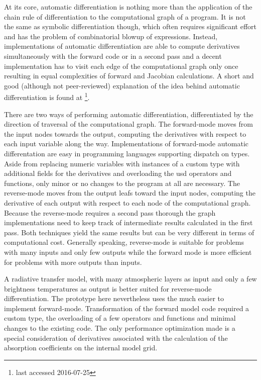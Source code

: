     At its core, automatic differentiation is nothing more than the application
    of the chain rule of differentiation to the computational graph of
    a program. It is not the same as symbolic differentiation though, which
    often requires significant effort and has the problem of combinatorial
    blowup of expressions. Instead, implementations of automatic
    differentiation are able to compute derivatives simultaneously with the
    forward code or in a second pass and a decent implementation has to visit
    each edge of the computational graph only once resulting in equal
    complexities of forward and Jacobian calculations. A short and good
    (although not peer-reviewed) explanation of the idea behind automatic
    differentiation is found at
    \footnote{last accessed 2016-07-25}.

    There are two ways of performing automatic differentiation, differentiated
    by the direction of traversal of the computational graph. The forward-mode
    moves from the input nodes towards the output, computing the derivatives
    with respect to each input variable along the way. Implementations of
    forward-mode automatic differentation are easy in programming languages
    supporting dispatch on types. Aside from replacing numeric variables with
    instances of a custom type with additional fields for the derivatives and
    overloading the usd operators and functions, only minor or no changes to
    the program at all are necessary. The reverse-mode moves from the output
    leafs toward the input nodes, computing the derivative of each output with
    respect to each node of the computational graph. Because the reverse-mode
    requires a second pass thorough the graph implementations need to keep
    track of intermediate results calculated in the first pass. Both techniques
    yield the same results but can be very different in terms of computational
    cost. Generally speaking, reverse-mode is suitable for problems with many
    inputs and only few outputs while the forward mode is more efficient for
    problems with more outputs than inputs.

    A radiative transfer model, with many atmospheric layers as input and only
    a few brightness temperatures as output is better suited for reverse-mode
    differentiation. The prototype here nevertheless uses the much easier to
    implement forward-mode. Transformation of the forward model code required
    a custom type, the overloading of a few operators and functions and minimal
    changes to the existing code. The only performance optimization made is
    a special consideration of derivatives associated with the calculation of
    the absorption coefficients on the internal model grid.


